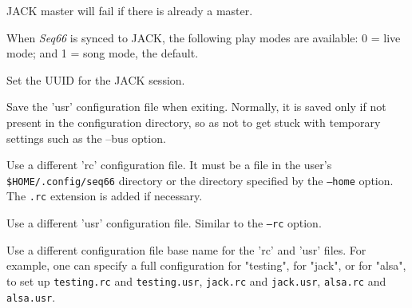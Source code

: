 
      JACK master will fail if there is already a master.


      When \textsl{Seq66} is synced to JACK, the following play modes
      are available: 0 = live mode; and 1 = song mode, the default.


      Set the UUID for the JACK session.

      Save the 'usr' configuration file when exiting.
      Normally, it is saved only if not present in the configuration directory,
      so as not to get stuck with temporary settings such as the --bus option.


      Use a different 'rc' configuration file.
      It must be a file in the user's \texttt{\$HOME/.config/seq66}
      directory or the directory specified by the \texttt{--home} option.
      The \texttt{.rc} extension is added if necessary.

      Use a different 'usr' configuration file.  Similar to the \texttt{--rc}
      option.

      Use a different configuration file base name for the 'rc' and 'usr'
      files.  For example, one can specify a full configuration for "testing",
      for "jack", or for "alsa", to set up
      \texttt{testing.rc} and \texttt{testing.usr},
      \texttt{jack.rc} and \texttt{jack.usr},
      \texttt{alsa.rc} and \texttt{alsa.usr}.

